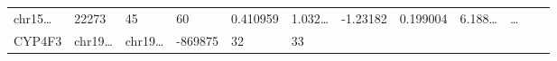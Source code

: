 \documentclass[
]{article}
\begin{document}
\begin{longtable}[]{@{}llllllllllll@{}}
\begin{minipage}[t]{0.06\columnwidth}
chr15\ldots{}\strut
\end{minipage} & \begin{minipage}[t]{0.06\columnwidth}\raggedright
22273\strut
\end{minipage} & \begin{minipage}[t]{0.06\columnwidth}\raggedright
45\strut
\end{minipage} & \begin{minipage}[t]{0.06\columnwidth}\raggedright
60\strut
\end{minipage} & \begin{minipage}[t]{0.06\columnwidth}\raggedright
0.410959\strut
\end{minipage} & \begin{minipage}[t]{0.08\columnwidth}\raggedright
1.032\ldots{}\strut
\end{minipage} & \begin{minipage}[t]{0.06\columnwidth}\raggedright
-1.23182\strut
\end{minipage} & \begin{minipage}[t]{0.06\columnwidth}\raggedright
0.199004\strut
\end{minipage} & \begin{minipage}[t]{0.09\columnwidth}\raggedright
6.188\ldots{}\strut
\end{minipage} & \begin{minipage}[t]{0.02\columnwidth}\raggedright
\ldots{}\strut
\end{minipage}\tabularnewline
\begin{minipage}[t]{0.06\columnwidth}\raggedright
CYP4F3\strut
\end{minipage} & \begin{minipage}[t]{0.06\columnwidth}\raggedright
chr19\ldots{}\strut
\end{minipage} & \begin{minipage}[t]{0.06\columnwidth}\raggedright
chr19\ldots{}\strut
\end{minipage} & \begin{minipage}[t]{0.06\columnwidth}\raggedright
-869875\strut
\end{minipage} & \begin{minipage}[t]{0.06\columnwidth}\raggedright
32\strut
\end{minipage} & \begin{minipage}[t]{0.06\columnwidth}\raggedright
33\strut
\end{minipage} & \begin{minipage}[t]{0.06\columnwidth}\raggedright

\end{minipage}
\end{longtable}
\end{document}
